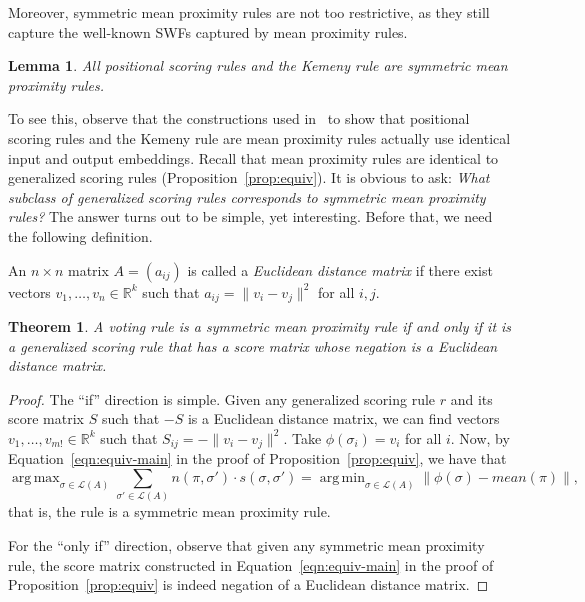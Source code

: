 \documentclass[10pt,letterpaper]{article}
\newcommand{\calL}{{\mathcal{L}}}
\newcommand{\rank}{{\calL(A)}}
\DeclareMathOperator*{\argmax}{arg\,max}
\DeclareMathOperator*{\argmin}{arg\,min}
\newtheorem{theorem}{Theorem}
\newtheorem{lemma}{Lemma}
\newenvironment{definition}[1][Definition]{\begin{trivlist}
\item[\hskip \labelsep {\bfseries #1}]}{\end{trivlist}}
\begin{document}
Moreover, symmetric mean proximity rules are not too restrictive, as they still capture the well-known SWFs captured by mean proximity rules.

\begin{lemma}
All positional scoring rules and the Kemeny rule are symmetric mean proximity rules.
\label{lem:symmetric-captures}
\end{lemma}

To see this, observe that the constructions used in~\cite{Zwicker08a} to show that positional scoring rules and the Kemeny rule are mean proximity rules actually use identical input and output embeddings. Recall that mean proximity rules are identical to generalized scoring rules (Proposition~\ref{prop:equiv}). It is obvious to ask: \emph{What subclass of generalized scoring rules corresponds to symmetric mean proximity rules?} The answer turns out to be simple, yet interesting. Before that, we need the following definition.


\begin{definition}[Euclidean Distance Matrix]
An $n \times n$ matrix $A = (a_{ij})$ is called a \emph{Euclidean distance matrix} if there exist vectors $v_1,\ldots,v_n \in \mathbb{R}^k$ such that $a_{ij} = \|v_i-v_j\|^2$ for all $i,j$. 
\end{definition}

\begin{theorem}
A voting rule is a symmetric mean proximity rule if and only if it is a generalized scoring rule that has a score matrix whose negation is a Euclidean distance matrix. 
\label{thm:symm}
\end{theorem}
\begin{proof}
The ``if'' direction is simple. Given any generalized scoring rule $r$ and its score matrix $S$ such that $-S$ is a Euclidean distance matrix, we can find vectors $v_1,\ldots,v_{m!} \in \mathbb{R}^k$ such that $S_{ij} = -\|v_i-v_j\|^2$. Take $\phi(\sigma_i) = v_i$ for all $i$. Now, by Equation~\eqref{eqn:equiv-main} in the proof of Proposition~\ref{prop:equiv}, we have that 
$$
\argmax_{\sigma \in \rank} \sum_{\sigma' \in \rank} n(\pi,\sigma') \cdot s(\sigma,\sigma') = \argmin_{\sigma \in \rank} \|\phi(\sigma)-mean(\pi)\|,
$$
that is, the rule is a symmetric mean proximity rule. 

For the ``only if'' direction, observe that given any symmetric mean proximity rule, the score matrix constructed in Equation~\eqref{eqn:equiv-main} in the proof of Proposition~\ref{prop:equiv} is indeed negation of a Euclidean distance matrix.
\end{proof}
\end{document}
